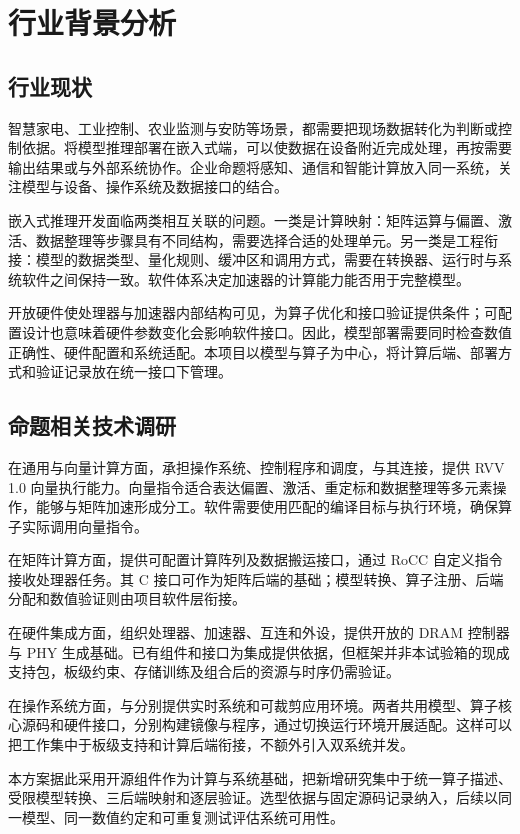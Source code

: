 \section{行业背景分析}
\subsection{行业现状}
智慧家电、工业控制、农业监测与安防等场景，都需要把现场数据转化为判断或控制依据。将模型推理部署在嵌入式端，可以使数据在设备附近完成处理，再按需要输出结果或与外部系统协作。企业命题将感知、通信和智能计算放入同一系统，关注模型与设备、操作系统及数据接口的结合。\cite{challenge}

嵌入式推理开发面临两类相互关联的问题。一类是计算映射：矩阵运算与偏置、激活、数据整理等步骤具有不同结构，需要选择合适的处理单元。另一类是工程衔接：模型的数据类型、量化规则、缓冲区和调用方式，需要在转换器、运行时与系统软件之间保持一致。软件体系决定加速器的计算能力能否用于完整模型。\cite{gemmini,technicalreport}

开放硬件使处理器与加速器内部结构可见，为算子优化和接口验证提供条件；可配置设计也意味着硬件参数变化会影响软件接口。因此，模型部署需要同时检查数值正确性、硬件配置和系统适配。本项目以模型与算子为中心，将计算后端、部署方式和验证记录放在统一接口下管理。

\subsection{命题相关技术调研}
在通用与向量计算方面，\ProcessorCore{}承担操作系统、控制程序和调度，\VectorUnit{}与其连接，提供 RVV 1.0 向量执行能力。向量指令适合表达偏置、激活、重定标和数据整理等多元素操作，能够与矩阵加速形成分工。软件需要使用匹配的编译目标与执行环境，确保算子实际调用向量指令。\cite{rocket,saturn,rvv,gcc}

在矩阵计算方面，\AcceleratorName{}提供可配置计算阵列及数据搬运接口，通过 RoCC 自定义指令接收处理器任务。其 C 接口可作为矩阵后端的基础；模型转换、算子注册、后端分配和数值验证则由项目软件层衔接。\cite{gemmini}

在硬件集成方面，\IntegrationFramework{}组织处理器、加速器、互连和外设，\MemoryController{}提供开放的 DRAM 控制器与 PHY 生成基础。已有组件和接口为集成提供依据，但框架并非本试验箱的现成支持包，板级约束、存储训练及组合后的资源与时序仍需验证。\cite{chipyard,litedram,technicalreport}

在操作系统方面，\RealTimeSystem{}与\LinuxDistribution{}分别提供实时系统和可裁剪应用环境。两者共用模型、算子核心源码和硬件接口，分别构建镜像与程序，通过切换运行环境开展适配。这样可以把工作集中于板级支持和计算后端衔接，不额外引入双系统并发。\cite{rtthread,linux}

本方案据此采用开源组件作为计算与系统基础，把新增研究集中于统一算子描述、受限模型转换、三后端映射和逐层验证。选型依据与固定源码记录纳入\SourceTechnicalReportName{}，后续以同一模型、同一数值约定和可重复测试评估系统可用性。\cite{technicalreport}
